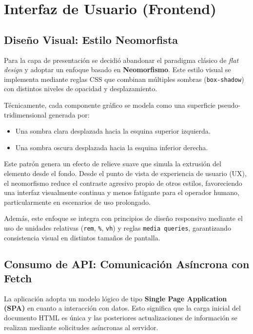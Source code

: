 \documentclass[12pt,letterpaper]{article}
\begin{document}
\section{Interfaz de Usuario (Frontend)}

\subsection{Diseño Visual: Estilo Neomorfista}

Para la capa de presentación se decidió abandonar el paradigma clásico de \textit{flat design} y adoptar un enfoque basado en \textbf{Neomorfismo}. Este estilo visual se implementa mediante reglas CSS que combinan múltiples sombras (\texttt{box-shadow}) con distintos niveles de opacidad y desplazamiento.

Técnicamente, cada componente gráfico se modela como una superficie pseudo-tridimensional generada por:
\begin{itemize}
    \item Una sombra clara desplazada hacia la esquina superior izquierda.
    \item Una sombra oscura desplazada hacia la esquina inferior derecha.
\end{itemize}

Este patrón genera un efecto de relieve suave que simula la extrusión del elemento desde el fondo. Desde el punto de vista de experiencia de usuario (UX), el neomorfismo reduce el contraste agresivo propio de otros estilos, favoreciendo una interfaz visualmente continua y menos fatigante para el operador humano, particularmente en escenarios de uso prolongado.

Además, este enfoque se integra con principios de diseño responsivo mediante el uso de unidades relativas (\texttt{rem}, \texttt{\%}, \texttt{vh}) y reglas \texttt{media queries}, garantizando consistencia visual en distintos tamaños de pantalla.

\subsection{Consumo de API: Comunicación Asíncrona con Fetch}

La aplicación adopta un modelo lógico de tipo \textbf{Single Page Application (SPA)} en cuanto a interacción con datos. Esto significa que la carga inicial del documento HTML es única y las posteriores actualizaciones de información se realizan mediante solicitudes asíncronas al servidor.
\end{document}
